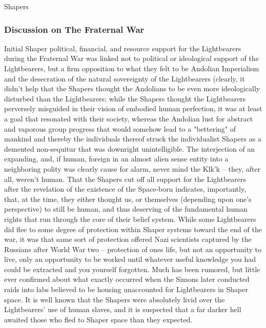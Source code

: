 Shapers



\subsubsection{Discussion on The Fraternal War}

Initial Shaper political, financial, and resource support for the
Lightbearers during the Fraternal War was linked not to political or
ideological support of the Lightbearers, but a firm opposition to what
they felt to be Andolian Imperialism and the desecration of the
natural sovereignty of the Lightbearers (clearly, it
didn't help that the Shapers thought the Andolians to be even more
ideologically disturbed than the Lightbearers; while the Shapers
thought the Lightbearers perversely misguided in their vision of
embodied human perfection, it was at least a goal that resonated with
their society, whereas the Andolian lust for abstract and vaporous
group progress that would somehow lead to a "bettering" of mankind
and thereby the individuals thereof struck the individualist Shapers
as a demented non-sequitur that was downright unintelligible. The
interjection of an expanding, and, if human, foreign in an almost
alien sense entity into a neighboring polity was clearly cause for
alarm, never mind the Klk'k -- they, after all, weren't human. That the Shapers cut off all support for the Lightbearers
after the revelation of the existence of the Space-born indicates,
importantly, that, at the time, they either thought us, or themselves
(depending upon one's perspective) to still be human, and thus
deserving of the fundamental human rights that run through the core of
their belief system. While some Lightbearers did flee to some degree
of protection within Shaper systems toward the end of the war, it was
that same sort of protection offered Nazi scientists captured by the
Russians after World War two -- protection of ones
life, but not an opportunity to live, only an opportunity to be worked
until whatever useful knowledge you had could be extracted and you
yourself forgotten. Much has been rumored, but little ever confirmed
about what exactly occurred when the Simons later conducted raids into
labs believed to be housing unaccounted for Lightbearers in Shaper
space. It is well known that the Shapers were absolutely livid over
the Lightbearers' use of human slaves, and it is suspected that a far
darker hell awaited those who fled to Shaper space than they expected.

